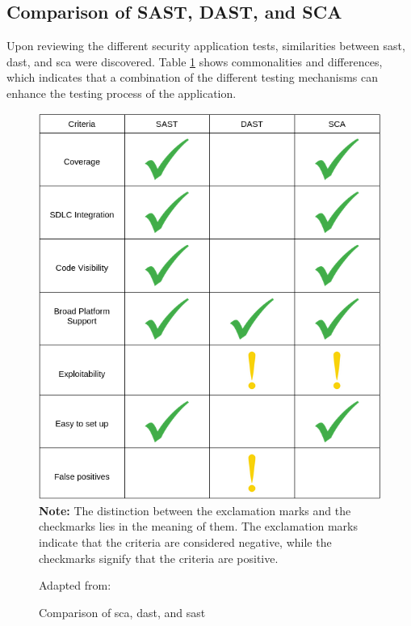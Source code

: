 \newpage
\subsection{Comparison of SAST, DAST, and SCA}
Upon reviewing the different security application tests, similarities between \acrshort{sast}, \acrshort{dast}, and \acrshort{sca} were discovered. Table \ref{fig: Comparison of SCA, DAST, and SASt} shows commonalities and differences, which indicates that a combination of the different testing mechanisms can enhance the testing process of the application. 

\vspace{2mm}
\begin{figure}[H]
    \centering
    \includegraphics[width=0.8\columnwidth]{Images/application-security-testing.png}\\
    \textbf{Note:} The distinction between the exclamation marks and the checkmarks lies in the meaning of them. The exclamation marks indicate that the criteria are considered negative, while the checkmarks signify that the criteria are positive.
    \caption{Comparison of \acrshort{sca}, \acrshort{dast}, and \acrshort{sast} }Adapted from: \cite{Comparison}
    \label{fig: Comparison of SCA, DAST, and SASt}
\end{figure}
\newpage
